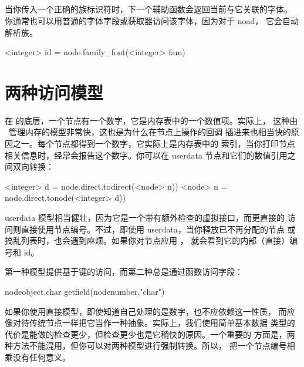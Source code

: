 \subsection{}


当你传入一个正确的族标识符时，下一个辅助函数会返回当前与它关联的字体。
你通常也可以用普通的字体字段或获取器访问该字体，因为对于 noad，
它会自动解析族。

\begin{typing}
<integer> id =
    node.family_font(<integer> fam)
\end{typing}

\section{两种访问模型}



在 \TEX 的底层，一个节点有一个数字，它是内存表中的一个数值项。实际上，
这种由 \TEX\ 管理内存的模型非常快，这也是为什么在节点上操作的回调
插进来也相当快的原因之一。每个节点都得到一个数字，它实际上是内存表中的
索引，当你打印节点相关信息时，经常会报告这个数字。你可以在 userdata
节点和它们的数值引用之间双向转换：

\begin{typing}
<integer> d = node.direct.todirect(<node> n))
<node> n = node.direct.tonode(<integer> d))
\end{typing}

userdata 模型相当健壮，因为它是一个带有额外检查的虚拟接口，而更直接的
访问则直接使用节点编号。不过，即使用 userdata，当你释放已不再分配的节点
或搞乱列表时，也会遇到麻烦。如果你对节点应用 ，
就会看到它的内部（直接）编号和 id。

第一种模型提供基于键的访问，而第二种总是通过函数访问字段：

\begin{typing}
nodeobject.char
getfield(nodenumber,"char")
\end{typing}

如果你使用直接模型，即使知道自己处理的是数字，也不应依赖这一性质，
而应像对待传统节点一样把它当作一种抽象。实际上，我们使用简单基本数据
类型的代价是能做的检查更少，但检查更少也是它稍快的原因。一个重要的
方面是，两种方法不能混用，但你可以对两种模型进行强制转换。所以，
把一个节点编号相乘没有任何意义。

